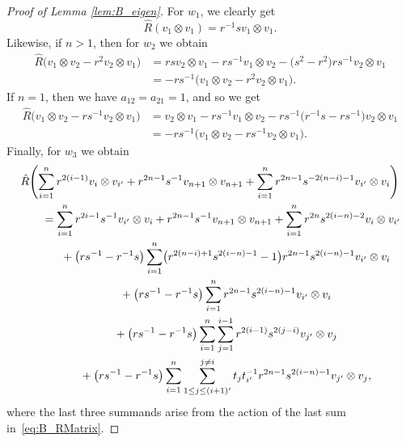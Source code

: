 \documentclass[10pt,a4paper]{amsart}
\numberwithin{equation}{section}
\begin{document}
\begin{proof}[Proof of Lemma \ref{lem:B_eigen}]
For $w_{1}$, we clearly get
\begin{displaymath}
 \hat{R}(v_{1} \otimes v_{1}) = r^{-1}s v_{1} \otimes v_{1} .
\end{displaymath}
Likewise, if $n>1$, then for $w_{2}$ we obtain
\begin{align*}
 \hat{R}\bigl(v_{1} \otimes v_{2} - r^{2}v_{2} \otimes v_{1}\bigr) &{}=
 rsv_{2} \otimes v_{1} - rs^{-1}v_{1} \otimes v_{2} - \bigl(s^{2} - r^{2}\bigr)rs^{-1}v_{2} \otimes v_{1} \\
 &{}=
 -rs^{-1}\bigl(v_{1} \otimes v_{2} - r^{2}v_{2} \otimes v_{1}\bigr).
\end{align*}
If $n = 1$, then we have $a_{12} = a_{21} = 1$, and so we get
\begin{displaymath}
\begin{split}
 \hat{R}\bigl(v_{1} \otimes v_{2} - rs^{-1}v_{2} \otimes v_{1}\bigr) &{}= v_{2} \otimes v_{1} - rs^{-1}v_{1} \otimes v_{2} - rs^{-1}\bigl(r^{-1}s - rs^{-1}\bigr)v_{2} \otimes v_{1} \\
 &{}= -rs^{-1}\bigl(v_{1} \otimes v_{2} - rs^{-1}v_{2} \otimes v_{1}\bigr).
\end{split}
\end{displaymath}
Finally, for $w_{3}$ we obtain
\begin{gather*}
 \hat{R} \Biggl( \sum_{i = 1}^{n}r^{2(i - 1)}v_{i} \otimes v_{i'} +
 r^{2n -1}s^{-1}v_{n+1} \otimes v_{n+1} +
 \sum_{i = 1}^{n}r^{2n - 1}s^{-2(n - i) - 1}v_{i'} \otimes v_{i} \Biggr) \\
 \qquad{} = \sum_{i = 1}^{n} r^{2i - 1}s^{-1}v_{i'} \otimes v_{i} +
 r^{2n - 1}s^{-1}v_{n+1} \otimes v_{n+1} +
 \sum_{i = 1}^{n}r^{2n}s^{2(i - n) - 2} v_{i} \otimes v_{i'} \\
 \qquad\hphantom{=}{} + \bigl(rs^{-1} - r^{-1}s\bigr)\sum_{i = 1}^{n}\bigl(r^{2(n - i) + 1}s^{2(i - n) - 1} - 1\bigr)r^{2n - 1}s^{2(i - n) - 1} v_{i'} \otimes v_{i} \\
 \qquad\hphantom{=}{} + \bigl(rs^{-1} - r^{-1}s\bigr)\sum_{i = 1}^{n} r^{2n - 1}s^{2(i - n) - 1} v_{i'} \otimes v_{i} \\
 \qquad\hphantom{=}{} + \bigl(rs^{-1} - r^{-1}s\bigr)\sum_{i = 1}^{n}\sum_{j = 1}^{i - 1} r^{2(i - 1)}s^{2(j - i)} v_{j'} \otimes v_{j} \\
 \qquad\hphantom{=}{} + \bigl(rs^{-1} - r^{-1}s\bigr) \sum_{i = 1}^{n} \sum_{1\leq j\leq (i+1)'}^{j \neq i}
 t_{j}t_{i'}^{-1}r^{2n - 1}s^{2(i - n) - 1} v_{j'} \otimes v_{j} ,
\end{gather*}
where the last three summands arise from the action of the last sum in~\eqref{eq:B_RMatrix}.


\end{proof}
\end{document}
